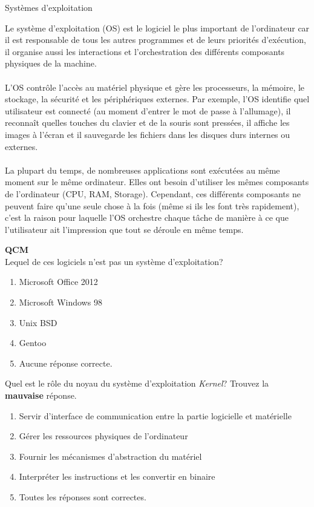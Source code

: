 \begin{section}{Systèmes d'exploitation}

Le système d'exploitation (OS) est le logiciel le plus important de l'ordinateur car il est responsable de tous les autres programmes et de leurs priorités d'exécution, il organise aussi les interactions et l'orchestration des différents composants physiques de la machine.
\\\\
L'OS contrôle l'accès au matériel physique et gère les processeurs, la mémoire, le stockage, la sécurité et les périphériques externes. Par exemple, l'OS identifie quel utilisateur est connecté (au moment d'entrer le mot de passe à l'allumage), il reconnaît quelles touches du clavier et de la souris sont pressées, il affiche les images à l'écran et il sauvegarde les fichiers dans les disques durs internes ou externes.
\\\\
La plupart du temps, de nombreuses applications sont exécutées au même moment sur le même ordinateur. Elles ont besoin d'utiliser les mêmes composants de l'ordinateur (CPU, RAM, Storage). Cependant, ces différents composants ne peuvent faire qu'une seule chose à la fois (même si ils les font très rapidement), c'est la raison pour laquelle l'OS orchestre chaque tâche de manière à ce que l'utilisateur ait l'impression que tout se déroule en même temps.
\\

    \begin{Exercice}[5 minutes]  \textbf{QCM}\\
    Lequel de ces logiciels n'est pas un système d'exploitation?
        \begin{enumerate}
            \item Microsoft Office 2012
            \item Microsoft Windows 98
            \item Unix BSD
            \item Gentoo
            \item Aucune réponse correcte.
        \end{enumerate}
    \end{Exercice}

    \begin{Exercice}[5 minutes]
        Quel est le rôle du noyau du système d'exploitation \textit{Kernel}? Trouvez la \textbf{mauvaise} réponse.
        \begin{enumerate}
            \item Servir d'interface de communication entre la partie logicielle et matérielle
            \item Gérer les ressources physiques de l'ordinateur
            \item Fournir les mécanismes d'abstraction du matériel
            \item Interpréter les instructions et les convertir en binaire
            \item Toutes les réponses sont correctes.
        \end{enumerate}
    \end{Exercice}


\end{section}
